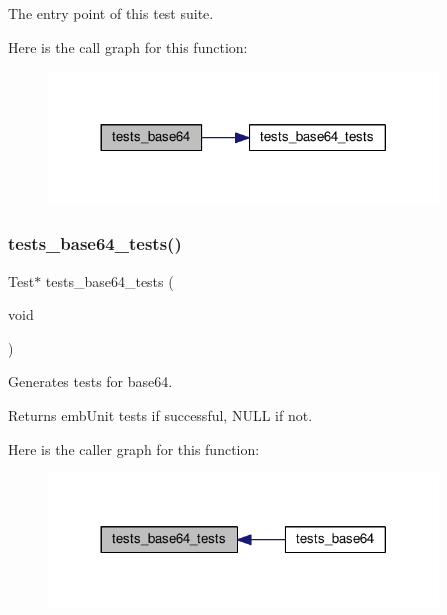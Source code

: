 The entry point of this test suite. 

Here is the call graph for this function\+:
\nopagebreak
\begin{figure}[H]
\begin{center}
\leavevmode
\includegraphics[width=293pt]{group__unittests_gad8db0d2b50c5b552f0173f6e55cc21b4_cgraph}
\end{center}
\end{figure}
\mbox{\label{group__unittests_ga7104265274747d0e2711d4f44feb9362}} 
\subsubsection{\texorpdfstring{tests\+\_\+base64\+\_\+tests()}{tests\_base64\_tests()}}
{\footnotesize\ttfamily Test$\ast$ tests\+\_\+base64\+\_\+tests (\begin{DoxyParamCaption}\item[{void}]{ }\end{DoxyParamCaption})}



Generates tests for base64. 

\begin{DoxyReturn}{Returns}
emb\+Unit tests if successful, N\+U\+LL if not. 
\end{DoxyReturn}
Here is the caller graph for this function\+:
\nopagebreak
\begin{figure}[H]
\begin{center}
\leavevmode
\includegraphics[width=293pt]{group__unittests_ga7104265274747d0e2711d4f44feb9362_icgraph}
\end{center}
\end{figure}
\mbox{\label{group__unittests_ga743f1615d5742924d9f921a17fe159a6}} 
